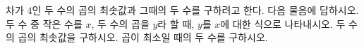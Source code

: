 차가 $4$인 두 수의 곱의 최솟값과 그때의 두 수를 구하려고 한다. 다음 물음에 답하시오.
 두 수 중 작은 수를 $x$, 두 수의 곱을 $y$라 할 때, $y$를 $x$에 대한 식으로 나타내시오.
 두 수의 곱의 최솟값을 구하시오.
 곱이 최소일 때의 두 수를 구하시오.
